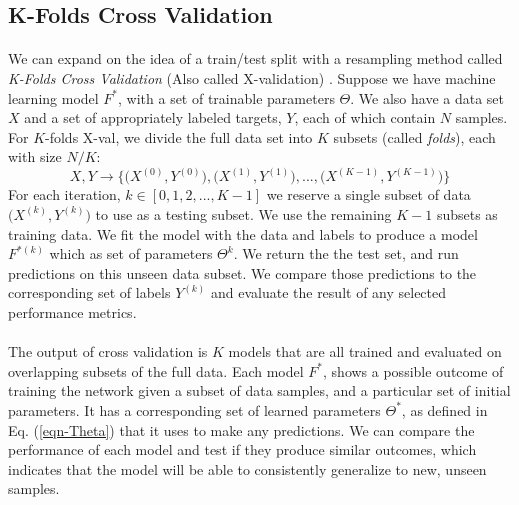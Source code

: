 \documentclass[12pt,letterpaper]{article}
\begin{document}

\subsection{K-Folds Cross Validation}
\label{subsec-XValidation}

\paragraph*{}We can expand on the idea of a train/test split with a resampling method called \textit{K-Folds Cross Validation} (Also called X-validation) \cite{Geron,James}. Suppose we have machine learning model $F^*$, with a set of trainable parameters $\Theta$. We also have a data set $X$ and a set of appropriately labeled targets, $Y$, each of which contain $N$ samples. For $K$-folds X-val, we divide the full data set into $K$ subsets (called \textit{folds}), each with size $N/K$:
\begin{equation}
\label{eqn-XValSplit}
X,Y \rightarrow \Big\{ \big(X^{(0)},Y^{(0)}\big) , \big(X^{(1)},Y^{(1)}\big) , ... , \big(X^{(K-1)},Y^{(K-1)}\big) \Big\}
\end{equation}
For each iteration, $k \in [0,1,2,...,K-1]$ we reserve a single subset of data $\big(X^{(k)},Y^{(k)}\big)$ to use as a testing subset. We use the remaining $K-1$ subsets as training data. We fit the model with the data and labels to produce a model $F^{*(k)}$ which as set of parameters $\Theta^{k}$. We return the the test set, and run predictions on this unseen data subset. We compare those predictions to the corresponding set of labels $Y^{(k)}$ and evaluate the result of any selected performance metrics.

\paragraph*{}The output of cross validation is $K$ models that are all trained and evaluated on overlapping subsets of the full data. Each model $F^*$, shows a possible outcome of training the network given a subset of data samples, and a particular set of initial parameters. It has a corresponding set of learned parameters $\Theta^*$, as defined in Eq. (\ref{eqn-Theta}) that it uses to make any predictions. We can compare the performance of each model and test if they produce similar outcomes, which indicates that the model will be able to consistently generalize to new, unseen samples.
\end{document}
